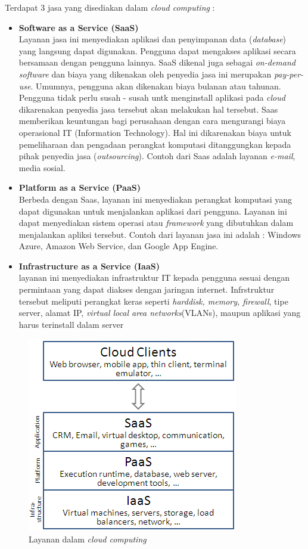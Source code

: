 Terdapat 3 jasa yang disediakan dalam \textit{cloud computing} :
\begin{itemize}
	\item \textbf{Software as a Service (SaaS)}\\
	Layanan jasa ini menyediakan aplikasi dan penyimpanan data (\textit{database}) yang langsung dapat digunakan. Pengguna dapat mengakses aplikasi secara bersamaan dengan pengguna lainnya. SaaS dikenal juga sebagai \textit{on-demand software} dan biaya yang dikenakan oleh penyedia jasa ini merupakan \textit{pay-per-use}. Umumnya, pengguna akan dikenakan biaya bulanan atau tahunan. Pengguna tidak perlu susah - susah untk menginstall aplikasi pada \textit{cloud} dikarenakan penyedia jasa tersebut akan melakukan hal tersebut. Saas memberikan keuntungan bagi perusahaan dengan cara mengurangi biaya operasional IT (Information Technology). Hal ini dikarenakan biaya untuk pemeliharaan dan pengadaan perangkat komputasi ditanggungkan kepada pihak penyedia jasa (\textit{outsourcing}). Contoh dari Saas adalah layanan \textit{e-mail}, media sosial.
	
	\item \textbf{Platform as a Service (PaaS)}\\
	Berbeda dengan Saas, layanan ini menyediakan perangkat komputasi yang dapat digunakan untuk menjalankan aplikasi dari pengguna. Layanan ini dapat menyediakan sistem operasi atau \textit{framework} yang dibutuhkan dalam menjalankan apliksi tersebut. Contoh dari layanan jasa ini adalah : Windows Azure, Amazon Web Service, dan Google App Engine.
	
	\item \textbf{Infrastructure as a Service (IaaS)}\\
	layanan ini menyediakan infrastruktur IT kepada pengguna sesuai dengan permintaan yang dapat diakses dengan jaringan internet. Infrstruktur tersebut meliputi perangkat keras seperti \textit{harddisk, memory, firewall}, tipe server, alamat IP, \textit{virtual local area networks}(VLANs), maupun aplikasi yang harus terinstall dalam server 
	  
\end{itemize}
\begin{figure}
	\centering
	\includegraphics[scale=0.6]{layanan_cloud.png}
	\caption{Layanan dalam \textit{cloud computing}}
\end{figure}